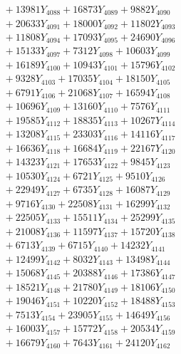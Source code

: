 \documentclass[a4paper,10pt]{article}
\begin{document}
{\begin{align}
&\;  + 13981 Y_{4088} + 16873 Y_{4089} + 9882 Y_{4090} \\[0.3ex]
&\;  + 20633 Y_{4091} + 18000 Y_{4092} + 11802 Y_{4093} \\[0.3ex]
&\;  + 11808 Y_{4094} + 17093 Y_{4095} + 24690 Y_{4096} \\[0.3ex]
&\;  + 15133 Y_{4097} + 7312 Y_{4098} + 10603 Y_{4099} \\[0.3ex]
&\;  + 16189 Y_{4100} + 10943 Y_{4101} + 15796 Y_{4102} \\[0.3ex]
&\;  + 9328 Y_{4103} + 17035 Y_{4104} + 18150 Y_{4105} \\[0.3ex]
&\;  + 6791 Y_{4106} + 21068 Y_{4107} + 16594 Y_{4108} \\[0.5ex]\allowbreak
&\;  + 10696 Y_{4109} + 13160 Y_{4110} + 7576 Y_{4111} \\[0.3ex]
&\;  + 19585 Y_{4112} + 18835 Y_{4113} + 10267 Y_{4114} \\[0.3ex]
&\;  + 13208 Y_{4115} + 23303 Y_{4116} + 14116 Y_{4117} \\[0.3ex]
&\;  + 16636 Y_{4118} + 16684 Y_{4119} + 22167 Y_{4120} \\[0.3ex]
&\;  + 14323 Y_{4121} + 17653 Y_{4122} + 9845 Y_{4123} \\[0.3ex]
&\;  + 10530 Y_{4124} + 6721 Y_{4125} + 9510 Y_{4126} \\[0.3ex]
&\;  + 22949 Y_{4127} + 6735 Y_{4128} + 16087 Y_{4129} \\[0.3ex]
&\;  + 9716 Y_{4130} + 22508 Y_{4131} + 16299 Y_{4132} \\[0.3ex]
&\;  + 22505 Y_{4133} + 15511 Y_{4134} + 25299 Y_{4135} \\[0.3ex]
&\;  + 21008 Y_{4136} + 11597 Y_{4137} + 15720 Y_{4138} \\[0.5ex]\allowbreak
&\;  + 6713 Y_{4139} + 6715 Y_{4140} + 14232 Y_{4141} \\[0.3ex]
&\;  + 12499 Y_{4142} + 8032 Y_{4143} + 13498 Y_{4144} \\[0.3ex]
&\;  + 15068 Y_{4145} + 20388 Y_{4146} + 17386 Y_{4147} \\[0.3ex]
&\;  + 18521 Y_{4148} + 21780 Y_{4149} + 18106 Y_{4150} \\[0.3ex]
&\;  + 19046 Y_{4151} + 10220 Y_{4152} + 18488 Y_{4153} \\[0.3ex]
&\;  + 7513 Y_{4154} + 23905 Y_{4155} + 14649 Y_{4156} \\[0.3ex]
&\;  + 16003 Y_{4157} + 15772 Y_{4158} + 20534 Y_{4159} \\[0.3ex]
&\;  + 16679 Y_{4160} + 7643 Y_{4161} + 24120 Y_{4162} \\[0.3ex]

\end{align}}
\end{document}
